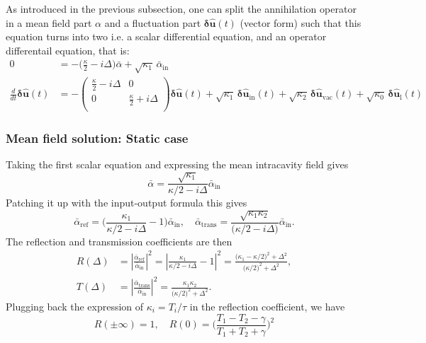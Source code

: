 As introduced in the previous subsection, one can split the annihilation operator in a mean field part $\alpha$ and a fluctuation part $\mathbf{\delta \hat{u}}(t)$ (vector form) such that this equation turns into two i.e. a scalar differential equation, and an operator differentail equation, that is:
 \begin{equation}
  \begin{split}
  0 &= -\Big(\frac{\kappa}{2}-i\Delta\Big) \bar{\alpha} + \sqrt{\kappa_1} \, \bar{\alpha}_{\mathrm{in}} \\
  \frac{d}{dt} \mathbf{\delta \hat{u}}(t)&= - \begin{pmatrix}
  \frac{\kappa}{2}-i\Delta & 0 \\ 
   0 & \frac{\kappa}{2}+i\Delta \\ 
  \end{pmatrix}  \mathbf{\delta \hat{u}}(t) + \sqrt{\kappa_{\mathrm{1}}} \, \mathbf{\delta \hat{u}_{\mathrm{in}}}(t)  + \sqrt{\kappa_2} \, \mathbf{\delta \hat{u}_{\mathrm{vac}}}(t) + \sqrt{\kappa_0} \, \mathbf{\delta \hat{u}_{\mathrm{l}}}(t) 
  \end{split}
\end{equation}

\subsubsection{Mean field solution: Static case}
Taking the first scalar equation and expressing the mean intracavity field gives 
\begin{equation}
  \bar{\alpha} =  \frac{\sqrt{\kappa_1}}{\kappa/2-i\Delta}  \bar{\alpha}_{\mathrm{in}} 
\end{equation}
Patching it up with the input-output formula this gives 
\begin{equation}
  \bar{\alpha}_{\mathrm{ref}} =  \Bigg( \frac{\kappa_1}{\kappa/2-i\Delta} - 1 \Bigg)  \bar{\alpha}_{\mathrm{in}}  , \quad   \bar{\alpha}_{\mathrm{trans}} =  \frac{\sqrt{\kappa_1 \kappa_2}}{\Big(\kappa/2-i\Delta\Big)} \bar{\alpha}_{\mathrm{in}}.
\end{equation}
The reflection and transmission coefficients are then
\begin{align}
R(\Delta) &= \left|\frac{\bar{\alpha}_{\mathrm{ref}}}{\bar{\alpha}_{\mathrm{in}}}\right|^2
= \left| \frac{\kappa_1}{\kappa/2 - i\Delta} -1 \right|^2
= \frac{\bigl(\kappa_1-\kappa/2\bigr)^2+\Delta^2}{\bigl(\kappa/2)^2+\Delta^2},\\[10pt]
T(\Delta) &= \left|\frac{\bar{\alpha}_{\mathrm{trans}}}{\bar{\alpha}_{\mathrm{in}}}\right|^2
= \frac{\kappa_1\kappa_2}{\bigl(\kappa/2\bigr)^2+\Delta^2}.
\end{align}
Plugging back the expression of $\kappa_i = T_i/\tau$ in the reflection coefficient, we have 
\begin{equation}
  R(\pm\infty) = 1 , \quad R(0) = \Bigg(\frac{T_1 - T_2 - \gamma}{T_1 + T_2 + \gamma}\Bigg)^2
\end{equation}

